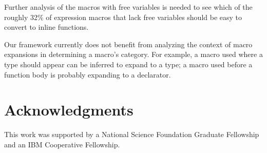 \documentclass[10pt]{article}
\begin{document}
Further analysis of the macros with free variables is needed to see which
of the roughly 32\% of expression macros that lack free variables should be
easy to convert to inline functions.

Our framework currently does not benefit from analyzing the context of
macro expansions in determining a macro's category.  For example, a
macro used where a type should appear can be inferred to expand to a
type; a macro used before a function body is probably expanding to a
declarator.


\section*{Acknowledgments}

This work was supported by a National Science Foundation Graduate
Fellowship and an IBM Cooperative Fellowship.
    


{\small }
\end{document}
